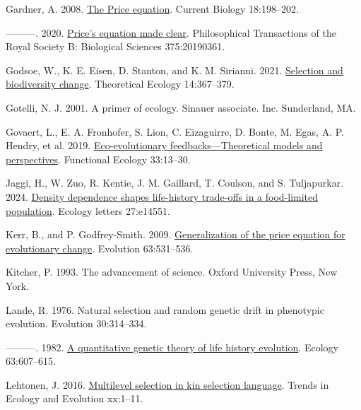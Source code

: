 \documentclass[
]{article}
\newlength{\cslhangindent}
\newenvironment{CSLReferences}[2] %
 {\begin{list}{}{%
  \setlength{\itemindent}{0pt}
  \setlength{\leftmargin}{0pt}
  \setlength{\parsep}{0pt}
  \ifodd #1
   \setlength{\leftmargin}{\cslhangindent}
   \setlength{\itemindent}{-1\cslhangindent}
  \fi
  \setlength{\itemsep}{#2\baselineskip}}}
 {\end{list}}
\begin{document}
\begin{CSLReferences}{0}{0}
Gardner, A. 2008. \href{https://doi.org/10.1016/j.cub.2008.01.005}{{The
Price equation}}. Current Biology 18:198--202.

---------. 2020. \href{https://doi.org/10.1098/rstb.2019.0361}{{Price's
equation made clear}}. Philosophical Transactions of the Royal Society
B: Biological Sciences 375:20190361.

Godsoe, W., K. E. Eisen, D. Stanton, and K. M. Sirianni. 2021.
\href{https://doi.org/10.1007/s12080-020-00478-3}{Selection and
biodiversity change}. Theoretical Ecology 14:367--379.

Gotelli, N. J. 2001. A primer of ecology. Sinauer associate. Inc.
Sunderland, MA.

Govaert, L., E. A. Fronhofer, S. Lion, C. Eizaguirre, D. Bonte, M. Egas,
A. P. Hendry, et al. 2019.
\href{https://doi.org/10.1111/1365-2435.13241}{{Eco-evolutionary
feedbacks---Theoretical models and perspectives}}. Functional Ecology
33:13--30.

Jaggi, H., W. Zuo, R. Kentie, J. M. Gaillard, T. Coulson, and S.
Tuljapurkar. 2024. \href{https://doi.org/10.1111/ele.14551}{Density
dependence shapes life-history trade-offs in a food-limited population}.
Ecology letters 27:e14551.

Kerr, B., and P. Godfrey-Smith. 2009.
\href{https://doi.org/10.1111/j.1558-5646.2008.00570.x}{{Generalization
of the price equation for evolutionary change}}. Evolution 63:531--536.

Kitcher, P. 1993. {The advancement of science}. Oxford University Press,
New York.

Lande, R. 1976. Natural selection and random genetic drift in phenotypic
evolution. Evolution 30:314--334.

---------. 1982. \href{https://doi.org/10.2307/1936778}{{A quantitative
genetic theory of life history evolution}}. Ecology 63:607--615.

Lehtonen, J. 2016.
\href{https://doi.org/10.1016/j.tree.2016.07.006}{{Multilevel selection
in kin selection language}}. Trends in Ecology and Evolution xx:1--11.


\end{CSLReferences}
\end{document}
